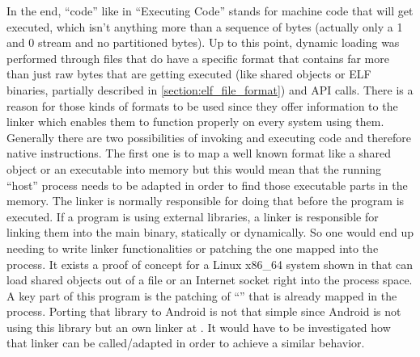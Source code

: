 In the end, ``code'' like in ``Executing Code'' stands for machine code that will get executed, which isn't anything more than a sequence of bytes (actually only a 1 and 0 stream and no partitioned bytes).
Up to this point, dynamic loading was performed through files that do have a specific format that contains far more than just raw bytes that are getting
executed (like shared objects or ELF binaries, partially described in
\autoref{section:elf_file_format}) and API calls.
There is a reason for those kinds of formats to be used since they offer information to the linker which enables them to function properly on every system using them.
Generally there are two possibilities of invoking and executing
code and therefore native instructions.
The first one is to map a well known format like a shared object or an executable
into memory but this would mean that the running ``host'' process needs to be adapted in order to find those executable parts in the memory. The linker is normally responsible for doing that before the program is executed.
If a program is using external libraries, a linker is responsible for linking them into the main binary, statically or dynamically.
So one would end up needing to write linker
functionalities or patching the one mapped into the process. It exists a proof of concept for a Linux x86\_64 system shown in \parencite{memdlopen} that can load
shared objects out of a file or an Internet socket right into the process space.
A key part of this program is the patching of ``'' that is already mapped in the process. Porting that library to Android is not that simple since Android is not using this library but an own linker at . It would have to be investigated how that linker can
be called/adapted in order to achieve a similar behavior.

